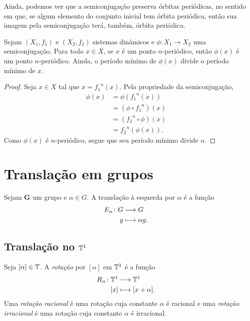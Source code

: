 Ainda, podemos ver que a semiconjugação preserva órbitas periódicas, no sentido em que, se algum elemento do conjunto inicial tem órbita periódica, então sua imagem pela semiconjugação terá, também, órbita periódica.

\begin{proposition}
Sejam $(X_1,f_1)$ e $(X_2,f_2)$ sistemas dinâmicos e $\phi: X_1 \to X_2$ uma semiconjugação. Para todo $x \in X$, se $x$ é um ponto $n$-periódico, então $\phi(x)$ é um ponto $n$-periódico. Ainda, o período mínimo de $\phi(x)$ divide o período mínimo de $x$.
\end{proposition}
\begin{proof} Seja $x \in X$ tal que $x = {f_1}^n(x)$. Pela propriedade da semiconjugação,
	\begin{align*}
	\phi(x) & = \phi({f_1}^n(x)) \\
      		  	 & = (\phi \circ {f_1}^n)(x) \\
      		  	 & = ({f_2}^n \circ \phi)(x) \\
      		  	 & = {f_2}^n(\phi(x)).
	\end{align*}
Como $\phi(x)$ é $n$-periódico, segue que seu período mínimo divide $n$.
\end{proof}


\section{Translação em grupos}

Sejam $\bm G$ um grupo e $\alpha \in G$. A translação à esquerda por $\alpha$ é a função
	\begin{align*}
	{E_\alpha}\colon {G} &\longrightarrow {G} \\{g} &\longmapsto \alpha g.
	\end{align*}

\subsection{Translação no \texorpdfstring{$\mathbb{T}^1$}{toro 1 dimensional}}

\begin{definition}
Seja $[\alpha] \in \mathbb{T}$. A \emph{rotação} por $[\alpha]$ em $\mathbb{T}^1$ é a função
	\begin{align*}
	{R_\alpha}\colon {\mathbb{T}^1} &\longrightarrow {\mathbb{T}^1} \\{[x]} &\longmapsto [x+\alpha].
	\end{align*}
Uma \emph{rotação racional} é uma rotação cuja constante $\alpha$ é racional e uma \emph{rotação irracional} é uma rotação cuja constante $\alpha$ é irracional.
\end{definition}

